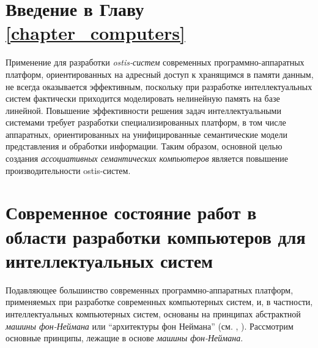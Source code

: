 \section*{Введение в Главу \ref{chapter_computers}}

Применение для разработки \textit{ostis-систем} современных программно-аппаратных платформ, ориентированных на адресный доступ к хранящимся в памяти данным, не всегда оказывается эффективным, поскольку при разработке интеллектуальных систем фактически приходится моделировать нелинейную память на базе линейной. Повышение эффективности решения задач интеллектуальными системами требует разработки специализированных платформ, в том числе аппаратных, ориентированных на унифицированные семантические модели представления и обработки информации. Таким образом, основной целью создания \textit{ассоциативных семантических компьютеров} является повышение производительности ostis-систем.

\section{Современное состояние работ в области разработки компьютеров для интеллектуальных систем}
\label{sec_comp_curr_state}

Подавляющее большинство современных программно-аппаратных платформ, применяемых при разработке современных компьютерных систем, и, в частности, интеллектуальных компьютерных систем, основаны на принципах абстрактной \textit{машины фон-Неймана} или ``архитектуры фон Неймана'' (см. , ). Рассмотрим основные принципы, лежащие в основе \textit{машины фон-Неймана}.

